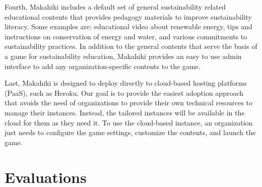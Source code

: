 \documentclass{acm_proc_article-sp}
\begin{document}
Fourth, Makahiki includes a default set of general sustainability related educational contents that provides pedagogy materials to improve sustainability literacy. Some examples are: educational video about renewable energy, tips and instructions on conservation of energy and water, and various commitments to sustainability practices. In addition to the general contents that serve the basis of a game for sustainability education, Makahiki provides an easy to use admin interface to add any organization-specific contents to the game.

Last, Makahiki is designed to deploy directly to cloud-based hosting platforms (PaaS), such as Heroku. Our goal is to provide the easiest adoption approach that avoids the need of organizations to provide their own technical resources to manage their instances. Instead, the tailored instances will be available in the cloud for them as they need it. To use the cloud-based instance, an organization just needs to configure the game settings, customize the contents, and  launch the game.

\section{Evaluations}

%
\end{document}
